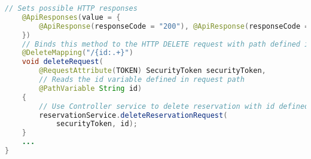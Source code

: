 \begin{lstlisting}[language=java, caption=ReservationRequestController.java, label=lst:controller]
    // Sets possible HTTP responses
    @ApiResponses(value = {
        @ApiResponse(responseCode = "200"), @ApiResponse(responseCode = "404", description = "Reservation request not found.", content = @Content),
    })
    // Binds this method to the HTTP DELETE request with path defined in @RequestMapping concatenated with "/{id:.+}". The ':' marks the start of a regex to be used for the id variable (useful to accept only numbers for example). The regex ".+" is used because shongo-id can include URL key characters like ':' or '-'.
    @DeleteMapping("/{id:.+}")
    void deleteRequest(
        @RequestAttribute(TOKEN) SecurityToken securityToken,
        // Reads the id variable defined in request path
        @PathVariable String id)
    {
        // Use Controller service to delete reservation with id defined in path
        reservationService.deleteReservationRequest(
            securityToken, id);
    }
    ...
}
\end{lstlisting}